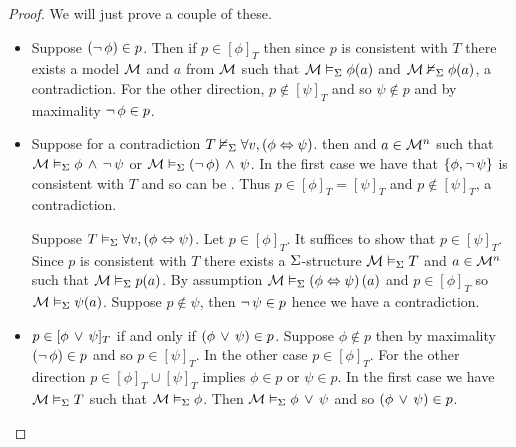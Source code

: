 \begin{proof}
    We will just prove a couple of these.
    \begin{itemize}
        \item Suppose $(\neg\, \phi) \in p$.
            Then if $p \in [\phi]_T$ then since $p$ is consistent with $T$
            there exists a model $\mathcal{M}$ and $a$ from 
            $\mathcal{M}$ such that
            $\mathcal{M} \vDash_{\Sigma} \phi(a)$ and $\mathcal{M} \nvDash_{\Sigma} \phi(a)$, 
            a contradiction.
            For the other direction, 
            $p \notin [\psi]_T$ and so $ \psi \notin p$ and
            by maximality $\neg\, \phi \in p$.
        \item \begin{forward}
            Suppose for a contradiction
            $T \nvDash_{\Sigma} \forall v, \left(\phi \Leftrightarrow \psi\right)$.
            then  and $a \in {\mathcal{M}}^n$ such that 
            $\mathcal{M} \vDash_{\Sigma} \phi \, \land \, \neg\, \psi$ or 
            $\mathcal{M} \vDash_{\Sigma} (\neg\, \phi) \, \land \, \psi$.
            In the first case we have that $\left\{\phi, \neg\, \psi\right\}$ 
            is consistent with $T$ and so can be 
            .
            Thus $p \in [\phi]_T = [\psi]_T$ and $p \notin [\psi]_T$, 
            a contradiction.
            \end{forward}
            \begin{backward}
                Suppose $T \vDash_{\Sigma} \forall v, \left(\phi \Leftrightarrow \psi\right)$.
                Let $p \in [\phi]_T$.
                It suffices to show that $p \in [\psi]_T$.
                Since $p$ is consistent with $T$ there exists a $\Sigma$-structure
                $\mathcal{M} \vDash_{\Sigma} T$ and $a \in {\mathcal{M}}^n$ such that 
                $\mathcal{M} \vDash_{\Sigma} p(a)$.
                By assumption $\mathcal{M} \vDash_{\Sigma} \left(\phi \Leftrightarrow \psi\right)(a)$
                and $p \in [\phi]_T$ so 
                $\mathcal{M} \vDash_{\Sigma} \psi(a)$.
                Suppose $p \notin \psi$, then $\neg\, \psi \in p$ hence 
                we have a contradiction.
            \end{backward}
        \item $p \in [\phi \, \lor \, \psi]_T$ if and only if 
            $(\phi \, \lor \, \psi) \in p$. 
            Suppose $\phi \notin p$ then by maximality 
            $(\neg\, \phi) \in p$ and so $p \in [\psi]_T$. 
            In the other case $p \in [\phi]_T$.
            For the other direction $p \in [\phi]_T \cup [\psi]_T$
            implies $\phi \in p$ or $\psi \in p$.
            In the first case we have $\mathcal{M} \vDash_{\Sigma} T$ such that 
            $\mathcal{M} \vDash_{\Sigma} \phi$.
            Then $\mathcal{M} \vDash_{\Sigma} \phi \, \lor \, \psi$ and so $(\phi \, \lor \, \psi) \in p$.
    \end{itemize}
\end{proof}


